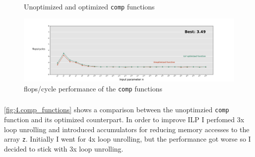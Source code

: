 \documentclass[tikz,14pt,fleqn]{article}
\begin{document}
\subsubsection{} %
\begin{figure}[h!]
    \begin{subfigure}{1\linewidth}
        \inputminted[fontsize=\scriptsize, bgcolor=CODEBG, firstline=62, lastline=68]{C}{../ex4/lu4.c}
    \end{subfigure}\\
    \begin{subfigure}{1\linewidth}
        \inputminted[fontsize=\scriptsize, bgcolor=CODEBG, firstline=62, lastline=82]{C}{../ex4/lu4_optimized.c}
    \end{subfigure}
    \caption{Unoptimized and optimized \texttt{comp} functions}
    \label{fig:4.comp_functions}
\end{figure}
\begin{figure}
    \vspace*{-0.7cm}
    \includegraphics[width=\linewidth]{../out/ex4.pdf}
    \caption{flops/cycle performance of the \texttt{comp} functions}
    \label{fig:4.comp_functions_plot}
\end{figure}
\subsubsection{} %
\subsubsection{} %

\subsubsection{} %
\autoref{fig:4.comp_functions} shows a comparison between the unoptimzied \texttt{comp} function and its optimized counterpart. In order to improve ILP I perfomed 3x loop unrolling and introduced accumulators for reducing memory accesses to the array \texttt{z}. Initially I went for 4x loop unrolling, but the performance got worse so I decided to stick with 3x loop unrolling.
\end{document}
